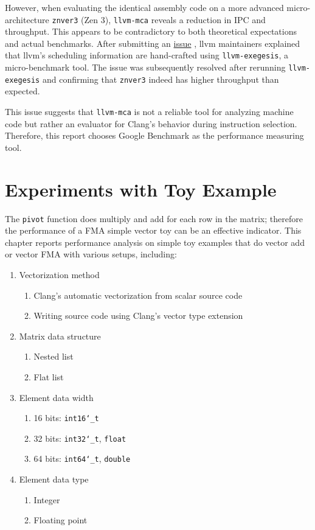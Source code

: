 \documentclass[logo,bsc,singlespacing,parskip]{infthesis}
\newcommand{\dtshort}{\texttt{int16\char`_t}}
\newcommand{\dtint}{\texttt{int32\char`_t}}
\newcommand{\dtlong}{\texttt{int64\char`_t}}
\newcommand{\dtfloat}{\texttt{float}}
\newcommand{\dtdouble}{\texttt{double}}
\newcommand{\pivot}{\texttt{pivot}}
\newcommand{\mca}{\texttt{llvm-mca}}
\newcommand{\exegesis}{\texttt{llvm-exegesis}}
\newenvironment{compactlist}
{ \begin{enumerate}
    \setlength{\itemsep}{0pt}
    \setlength{\parskip}{0pt}
    \setlength{\parsep}{0pt}     
}
{ \end{enumerate} }
\begin{document}

However, when evaluating the identical assembly code on a more advanced
micro-architecture \texttt{znver3} (Zen 3), \mca{} reveals a reduction in IPC and
throughput. This appears to be contradictory to both theoretical expectations
and actual benchmarks. After submitting an
\href{https://github.com/llvm/llvm-project/issues/59325}{issue}
\cite{mca-issue}, llvm maintainers explained that llvm's scheduling information
are hand-crafted using \exegesis{}, a micro-benchmark tool. The issue was
subsequently resolved after rerunning \exegesis{} and confirming that
\texttt{znver3} indeed has higher throughput than expected. 

This issue suggests that \mca{} is not a reliable tool for analyzing machine
code but rather an evaluator for Clang's behavior during instruction selection.
Therefore, this report chooses Google Benchmark as the performance measuring
tool.


\chapter{Experiments with Toy Example}
\label{sec:Toy}

The \pivot{} function does multiply and add for each row in the matrix;
therefore the performance of a FMA simple vector toy can be an effective
indicator. This chapter reports performance analysis on simple toy examples that
do vector add or vector FMA with various setups, including: 

\begin{enumerate} 
    \item Vectorization method 
        \begin{compactlist} 
            \item Clang's automatic vectorization from scalar source code
            \item Writing source code using Clang's vector type extension
        \end{compactlist}
    \item Matrix data structure 
        \begin{compactlist} 
            \item Nested list
            \item Flat list
        \end{compactlist}
    \item Element data width
        \begin{compactlist} 
            \item 16 bits: \dtshort{}
            \item 32 bits: \dtint{}, \dtfloat{}
            \item 64 bits: \dtlong{}, \dtdouble{}
        \end{compactlist}
    \item Element data type 
        \begin{compactlist} 
            \item Integer
            \item Floating point
        \end{compactlist}
\end{enumerate}
\end{document}
